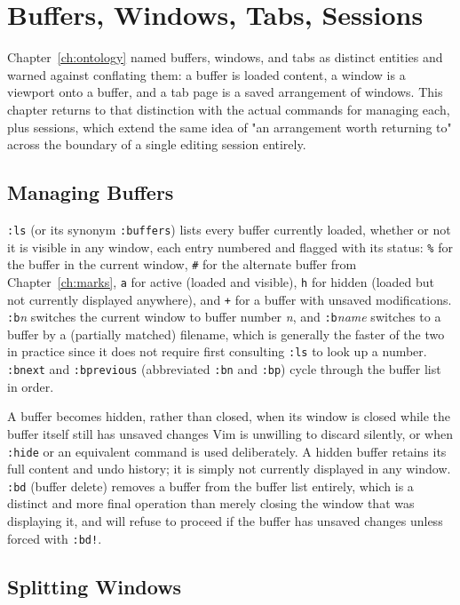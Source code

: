 \chapter{Buffers, Windows, Tabs, Sessions}
\label{ch:buffers}

Chapter~\ref{ch:ontology} named buffers, windows, and tabs as distinct entities and warned against conflating them: a buffer is loaded content, a window is a viewport onto a buffer, and a tab page is a saved arrangement of windows. This chapter returns to that distinction with the actual commands for managing each, plus sessions, which extend the same idea of "an arrangement worth returning to" across the boundary of a single editing session entirely.

\section{Managing Buffers}

\texttt{:ls} (or its synonym \texttt{:buffers}) lists every buffer currently loaded, whether or not it is visible in any window, each entry numbered and flagged with its status: \texttt{\%} for the buffer in the current window, \texttt{\#} for the alternate buffer from Chapter~\ref{ch:marks}, \texttt{a} for active (loaded and visible), \texttt{h} for hidden (loaded but not currently displayed anywhere), and \texttt{+} for a buffer with unsaved modifications. \texttt{:b}\textit{n} switches the current window to buffer number \textit{n}, and \texttt{:b}\textit{name} switches to a buffer by a (partially matched) filename, which is generally the faster of the two in practice since it does not require first consulting \texttt{:ls} to look up a number. \texttt{:bnext} and \texttt{:bprevious} (abbreviated \texttt{:bn} and \texttt{:bp}) cycle through the buffer list in order.

A buffer becomes hidden, rather than closed, when its window is closed while the buffer itself still has unsaved changes Vim is unwilling to discard silently, or when \texttt{:hide} or an equivalent command is used deliberately. A hidden buffer retains its full content and undo history; it is simply not currently displayed in any window. \texttt{:bd} (buffer delete) removes a buffer from the buffer list entirely, which is a distinct and more final operation than merely closing the window that was displaying it, and will refuse to proceed if the buffer has unsaved changes unless forced with \texttt{:bd!}.

\section{Splitting Windows}

